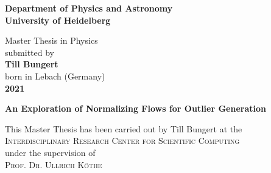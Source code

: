 \begin{titlepage}
\begin{center}
 
\Large\textbf{Department of Physics and Astronomy\\
University of Heidelberg}

\vspace{18cm}

\normalsize
Master Thesis in Physics\\
submitted by\\
\vspace{0.5cm}
\Large\textbf{Till Bungert}\\
\normalsize
\vspace{0.5cm}
born in Lebach (Germany)\\
\vspace{0.5cm}
\Large\textbf{2021}
\normalsize

\newpage

\Large\textbf{An Exploration of Normalizing Flows for Outlier Generation}

\vfill

\normalsize
\begin{doublespace}
This Master Thesis has been carried out by Till Bungert at the\\
\textsc{Interdisciplinary Research Center for Scientific Computing}\\
under the supervision of\\
\textsc{Prof. Dr. Ullrich Köthe}
\end{doublespace}

\end{center}

\end{titlepage}
